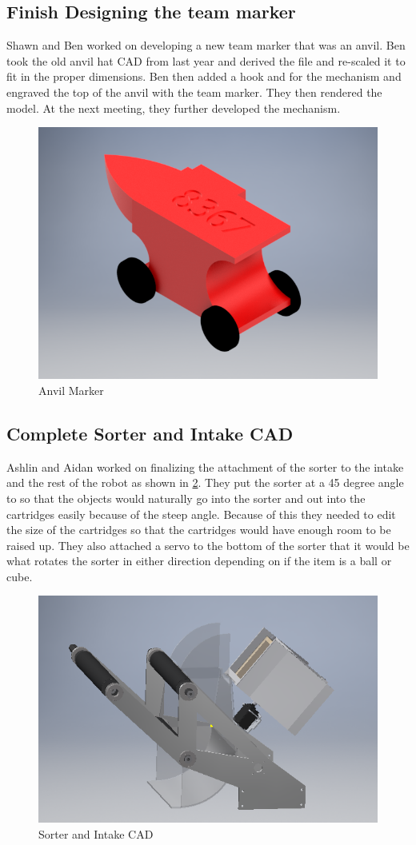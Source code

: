 \documentclass{article}
\newif\ifcontents
\begin{document}
\contentsfalse

\subsection{Finish Designing the team marker}
Shawn and Ben worked on developing a new team marker that was an anvil. Ben took the old anvil hat CAD from last year and derived the file and re-scaled it to fit in the proper dimensions. Ben then added a hook and for the mechanism and engraved the top of the anvil with the team marker. They then rendered the model. At the next meeting, they further developed the mechanism.

\begin{figure}
    \centering
    \includegraphics[width=.6 \textwidth]{07_10-15/images/REAL_anvil_marker.png}
    \caption{Anvil Marker}
    \label{fig:marker}
\end{figure}

\subsection{Complete Sorter and Intake CAD}
Ashlin and Aidan worked on finalizing the attachment of the sorter to the intake and the rest of the robot as shown in \ref{fig:Intake CAD}. They put the sorter at a 45 degree angle to so that the objects would naturally go into the sorter and out into the cartridges easily because of the steep angle. Because of this they needed to edit the size of the cartridges so that the cartridges would have enough room to be raised up. They also attached a servo to the bottom of the sorter that it would be what rotates the sorter in either direction depending on if the item is a ball or cube.

\begin{figure}
    \centering
    \includegraphics[width=.6 \textwidth]{07_10-15/images/IntakeCAD.png}
    \caption{Sorter and Intake CAD}
    \label{fig:Intake CAD}
\end{figure}
\end{document}
